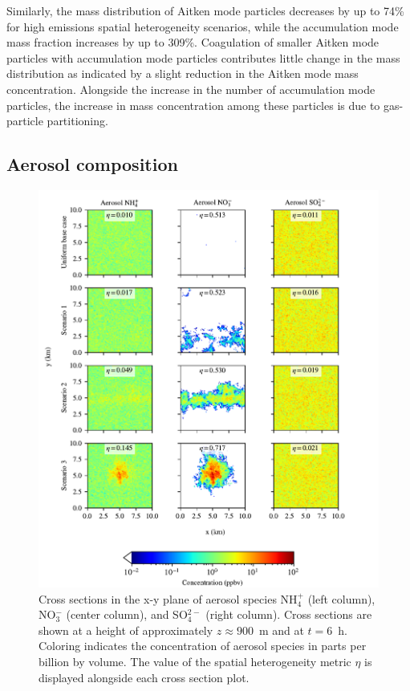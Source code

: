\documentclass[journal abbreviation, manuscript]{copernicus}
\begin{document}
Similarly, the mass distribution of Aitken mode particles decreases by
up to 74\% for high emissions spatial heterogeneity scenarios, while
the accumulation mode mass fraction increases by up to
309\%. Coagulation of smaller Aitken mode particles with accumulation
mode particles contributes little change in the mass distribution as
indicated by a slight reduction in the Aitken mode mass
concentration. Alongside the increase in the number of accumulation mode 
particles, the increase in mass concentration among these particles is due 
to gas-particle partitioning. 


\subsection{Aerosol composition}\label{sec:aero-comp}

\begin{figure}[!h]
	\centering
	\includegraphics[]{figures/aerosol-SNA-spatial-heterogeneity-time36-z45.pdf}
	\caption{Cross sections in the x-y plane of aerosol species
          NH$_4^+$ (left column), NO$_3^-$ (center column), and
          SO$_4^{2-}$ (right column). Cross sections are shown at a
          height of approximately $z\approx900$~m and at
          $t=6$~h. Coloring indicates the concentration of aerosol
          species in parts per billion by volume. The value of the
          spatial heterogeneity metric $\eta$ is displayed alongside
          each cross section plot.}
	\label{fig:aero-cross-sec}
\end{figure} 
\end{document}
